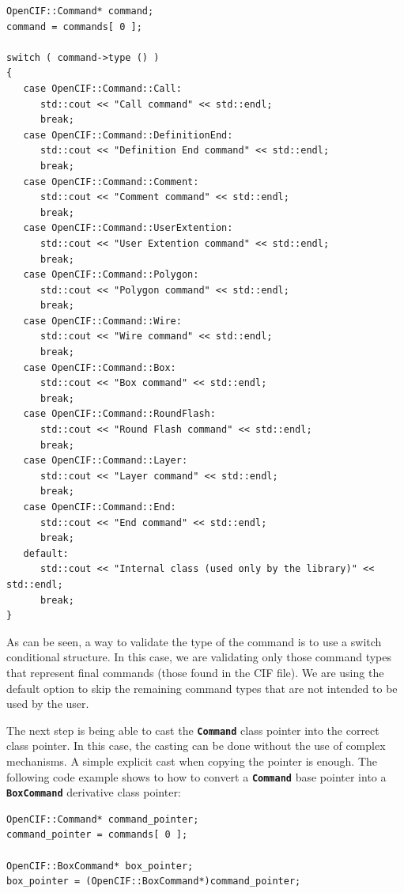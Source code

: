 \documentclass[11pt,twoside,openany,x11names,svgnames]{memoir}
\begin{document}
\begin{lstlisting}[frame=single,style=CPPStyle]
OpenCIF::Command* command;
command = commands[ 0 ];

switch ( command->type () )
{
   case OpenCIF::Command::Call:
      std::cout << "Call command" << std::endl;
      break;
   case OpenCIF::Command::DefinitionEnd:
      std::cout << "Definition End command" << std::endl;
      break;
   case OpenCIF::Command::Comment:
      std::cout << "Comment command" << std::endl;
      break;
   case OpenCIF::Command::UserExtention:
      std::cout << "User Extention command" << std::endl;
      break;
   case OpenCIF::Command::Polygon:
      std::cout << "Polygon command" << std::endl;
      break;
   case OpenCIF::Command::Wire:
      std::cout << "Wire command" << std::endl;
      break;
   case OpenCIF::Command::Box:
      std::cout << "Box command" << std::endl;
      break;
   case OpenCIF::Command::RoundFlash:
      std::cout << "Round Flash command" << std::endl;
      break;
   case OpenCIF::Command::Layer:
      std::cout << "Layer command" << std::endl;
      break;
   case OpenCIF::Command::End:
      std::cout << "End command" << std::endl;
      break;
   default:
      std::cout << "Internal class (used only by the library)" << std::endl;
      break;
}
\end{lstlisting}

As can be seen, a way to validate the type of the command is to use a switch conditional structure. In this case, we are validating only those command types that represent final commands (those found in the CIF file). We are using the default option to skip the remaining command types that are not intended to be used by the user.

The next step is being able to cast the \textbf{\texttt{Command}} class pointer into the correct class pointer. In this case, the casting can be done without the use of complex mechanisms. A simple explicit cast when copying the pointer is enough. The following code example shows to how to convert a \textbf{\texttt{Command}} base pointer into a \textbf{\texttt{BoxCommand}} derivative class pointer:

\begin{lstlisting}[frame=single,style=CPPStyle]
OpenCIF::Command* command_pointer;
command_pointer = commands[ 0 ];

OpenCIF::BoxCommand* box_pointer;
box_pointer = (OpenCIF::BoxCommand*)command_pointer;
\end{lstlisting}
\end{document}
